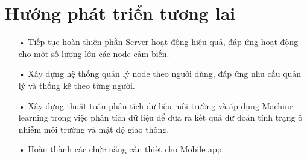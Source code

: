 \section{Hướng phát triển tương lai}
\begin{itemize}
\item[•]Tiếp tục hoàn thiện phần Server hoạt động hiệu quả, đáp ứng hoạt động cho một số lượng lớn các node cảm biến.
\item[•]Xây dựng hệ thống quản lý node theo người dùng, đáp ứng nhu cầu quản lý và thống kê theo từng người.
\item[•]Xây dựng thuật toán phân tích dữ liệu môi trường và áp dụng Machine learning trong việc phân tích dữ liệu để đưa ra kết quả dự đoán tính trạng ô nhiễm môi trường và mật độ giao thông.
\item[•]Hoàn thành các chức năng cần thiết cho Mobile app.
\end{itemize}
